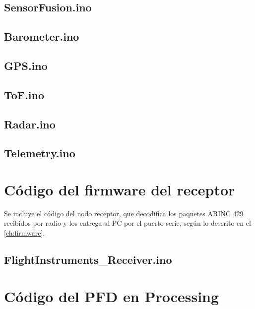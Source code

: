 \section{SensorFusion.ino}


\section{Barometer.ino}


\section{GPS.ino}


\section{ToF.ino}


\section{Radar.ino}


\section{Telemetry.ino}



\chapter{Código del firmware del receptor}
\label{anexo:fw_rx}

Se incluye el código del nodo receptor, que decodifica los paquetes ARINC 429
recibidos por radio y los entrega al PC por el puerto serie, según lo descrito en
el \cref{ch:firmware}.

\section{FlightInstruments\_Receiver.ino}



\chapter{Código del PFD en Processing}
\label{anexo:pfd}

